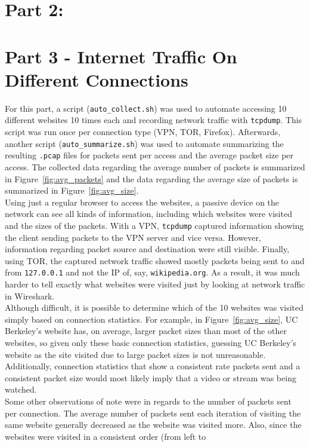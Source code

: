 \documentclass[11pt]{article}
\begin{document}
\section*{Part 2:}
\section*{Part 3 - Internet Traffic On Different Connections}
For this part, a script (\verb|auto_collect.sh|) was used to automate accessing 10 different
websites 10 times each and recording network traffic with \verb|tcpdump|. This script was run
once per connection type (VPN, TOR, Firefox). Afterwards, another script (\verb|auto_summarize.sh|)
was used to automate summarizing the resulting \verb|.pcap| files for packets sent per access
and the average packet size per access. The collected data regarding the average number of packets
is summarized in Figure~\ref{fig:avg_packets} and the data regarding the average size of packets
is summarized in Figure~\ref{fig:avg_size}.\\
Using just a regular browser to access the websites, a passive device on the network can see
all kinds of information, including which websites were visited and the sizes of the packets. With a
VPN, \verb|tcpdump| captured information showing the client sending packets to the VPN server and
vice versa. However, information regarding packet source and destination were still visible. Finally,
using TOR, the captured network traffic showed mostly packets being sent to and from \verb|127.0.0.1|
and not the IP of, say, \verb|wikipedia.org|. As a result, it was much harder to tell exactly what
websites were visited just by looking at network traffic in Wireshark.\\
Although difficult, it is possible to determine which of the 10 websites was visited simply based on
connection statistics. For example, in Figure~\ref{fig:avg_size}, UC Berkeley's website has, on average,
larger packet sizes than most of the other websites, so given only these basic connection statistics,
guessing UC Berkeley's website as the site visited due to large packet sizes is not unreasonable.
Additionally, connection statistics that show a consistent rate packets sent and a consistent packet
size would most likely imply that a video or stream was being watched.\\
Some other observations of note were in regards to the number of packets sent per connection. The 
average number of packets sent each iteration of visiting the same website generally decreased as the
website was visited more. Also, since the websites were visited in a consistent order (from left to 
\end{document}
